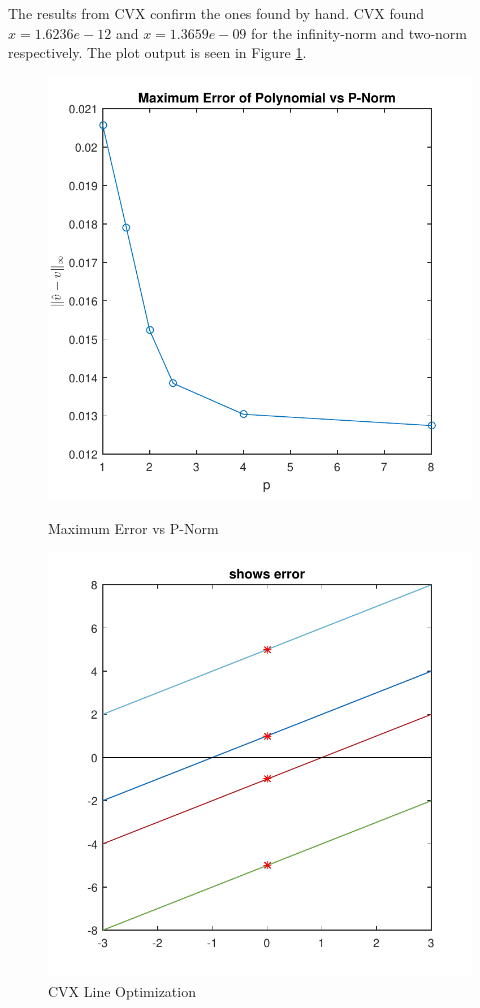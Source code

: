 \documentclass[letterpaper,12pt,]{article}
\begin{document}
The results from CVX confirm the ones found by hand. CVX found $x = 1.6236e-12$ and $x = 1.3659e-09$ for the infinity-norm and two-norm respectively. The plot output is seen in Figure \ref{fig:q12}.

\begin{figure}[ht]
\begin{minipage}[b]{0.45\linewidth}
    \centering
    \includegraphics[height=0.35\textheight]{q11plot}
    \caption{Maximum Error vs P-Norm}
    \label{fig:q11}
\end{minipage}
\hspace{0.5cm}
\begin{minipage}[b]{0.45\linewidth}
    \centering
    \includegraphics[height=0.35\textheight]{q12plot}
    \caption{CVX Line Optimization}
    \label{fig:q12}
\end{minipage}
\end{figure}
\end{document}

